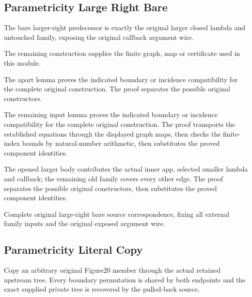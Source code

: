 \subsection{Parametricity Large Right Bare}
The bare larger-right predecessor is exactly the original larger closed
lambda and untouched family, exposing the original callback argument wire.

The remaining construction supplies the finite graph, map or certificate used in this module.
\par{}

The apart lemma proves the indicated boundary or incidence compatibility for the complete original construction.
The proof separates the possible original constructors.
\par{}

The remaining input lemma proves the indicated boundary or incidence compatibility for the complete original construction.
The proof transports the established equations through the displayed graph maps, then checks the finite-index bounds by natural-number arithmetic, then substitutes the proved component identities.
\par{}

The opened larger body contributes the actual inner app, selected
smaller lambda and callback; the remaining old family covers every other edge.
The proof separates the possible original constructors, then substitutes the proved component identities.
\par{}

Complete original large-right bare source correspondence, fixing all
external family inputs and the original exposed argument wire.
\par{}

\subsection{Parametricity Literal Copy}
Copy an arbitrary original Figure20 member through the actual retained
upstream tree. Every boundary permutation is shared by both endpoints and
the exact supplied private tree is recovered by the pulled-back source.

